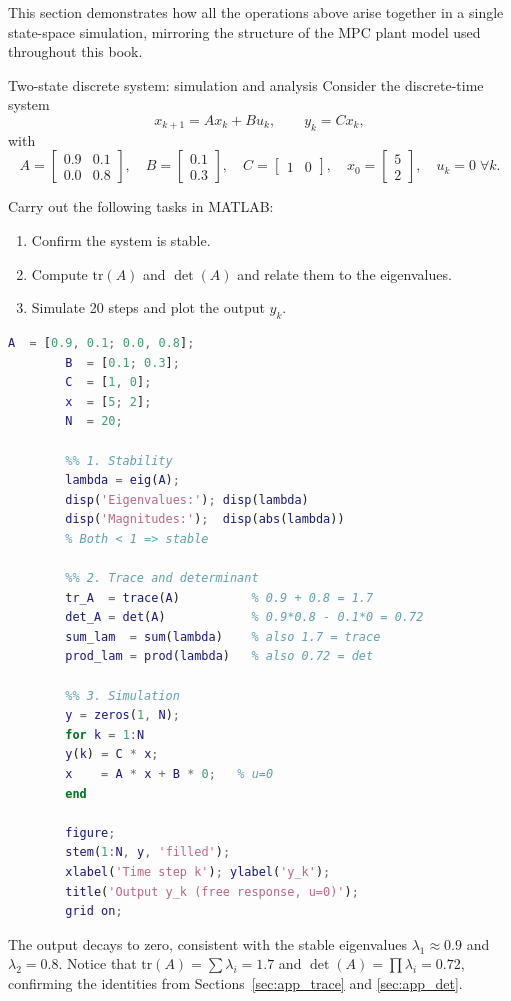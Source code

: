 This section demonstrates how all the operations above arise together
in a single state-space simulation, mirroring the structure of the MPC
plant model used throughout this book.

\begin{examplebox}{Two-state discrete system: simulation and analysis}
	Consider the discrete-time system
	\[
	x_{k+1} = A x_k + B u_k, \qquad y_k = C x_k,
	\]
	with
	\[
	A = \begin{bmatrix} 0.9 & 0.1 \\ 0.0 & 0.8 \end{bmatrix},
	\quad
	B = \begin{bmatrix} 0.1 \\ 0.3 \end{bmatrix},
	\quad
	C = \begin{bmatrix} 1 & 0 \end{bmatrix},
	\quad
	x_0 = \begin{bmatrix} 5 \\ 2 \end{bmatrix},
	\quad u_k = 0\;\forall k.
	\]
	
	Carry out the following tasks in MATLAB:
	\begin{enumerate}[noitemsep]
		\item Confirm the system is stable.
		\item Compute $\mathrm{tr}(A)$ and $\det(A)$ and relate them to the
		eigenvalues.
		\item Simulate 20 steps and plot the output $y_k$.
	\end{enumerate}
	
	\solution
	\begin{lstlisting}[language=Matlab]
		A  = [0.9, 0.1; 0.0, 0.8];
		B  = [0.1; 0.3];
		C  = [1, 0];
		x  = [5; 2];
		N  = 20;
		
		%% 1. Stability
		lambda = eig(A);
		disp('Eigenvalues:'); disp(lambda)
		disp('Magnitudes:');  disp(abs(lambda))
		% Both < 1 => stable
		
		%% 2. Trace and determinant
		tr_A  = trace(A)          % 0.9 + 0.8 = 1.7
		det_A = det(A)            % 0.9*0.8 - 0.1*0 = 0.72
		sum_lam  = sum(lambda)    % also 1.7 = trace
		prod_lam = prod(lambda)   % also 0.72 = det
		
		%% 3. Simulation
		y = zeros(1, N);
		for k = 1:N
		y(k) = C * x;
		x    = A * x + B * 0;   % u=0
		end
		
		figure;
		stem(1:N, y, 'filled');
		xlabel('Time step k'); ylabel('y_k');
		title('Output y_k (free response, u=0)');
		grid on;
	\end{lstlisting}
	
	The output decays to zero, consistent with the stable eigenvalues
	$\lambda_1 \approx 0.9$ and $\lambda_2 = 0.8$.  Notice that
	$\mathrm{tr}(A) = \sum \lambda_i = 1.7$ and
	$\det(A) = \prod \lambda_i = 0.72$, confirming the identities from
	Sections~\ref{sec:app_trace} and \ref{sec:app_det}.
\end{examplebox}

